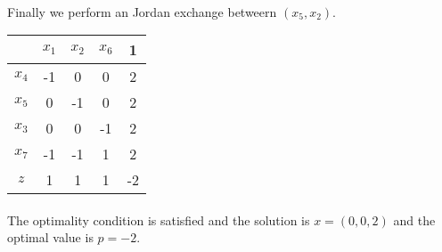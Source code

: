 \paragraph{}
Finally we perform an Jordan exchange betweern $(x_5, x_2)$.
\begin{center}
	\begin{tabular}{ c | c  c  c | c }
		\      & $x_1$ & $x_2$ & $x_6$ &   1 \\ \hline
		$x_4$  &    -1 &     0 &     0 &   2 \\ 
		$x_5$  &     0 &    -1 &     0 &   2 \\ 
		$x_3$  &     0 &     0 &    -1 &   2 \\
		$x_7$  &    -1 &    -1 &     1 &   2 \\ \hline
		$z$    &     1 &     1 &     1 &  -2 \\ 		
	\end{tabular}
\end{center}
\paragraph{}
The optimality condition is satisfied and the solution is $x=(0,0,2)$ and the optimal value is $p=-2$.